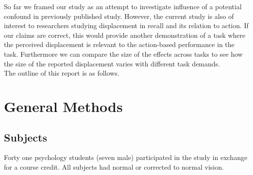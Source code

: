 \documentclass[10pt]{article}
\begin{document}
So far we framed our study as an attempt to investigate influence of a potential confound in previously published study. 
However, the current study is also of interest to researchers studying displacement in recall and its relation to action. 
If our claims are correct, this would provide another demonstration of a task where the perceived displacement is relevant to the action-based performance in the task. %
Furthermore we can compare the size of the effects across tasks to see how the size of the reported displacement varies with different task demands.\\

The outline of this report is as follows. %


\section*{General Methods}
\subsection*{Subjects}
Forty one psychology students (seven male) participated in the study in exchange for a course credit.
All subjects had normal or corrected to normal vision.
\end{document}
